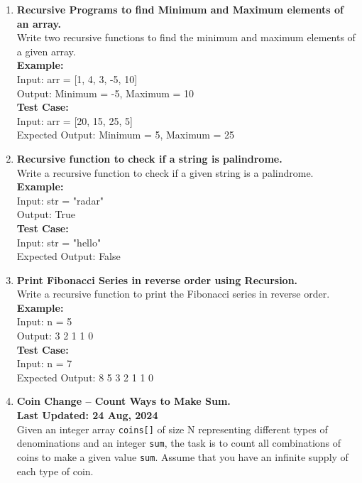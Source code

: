 \documentclass[12pt]{article}
\begin{document}
\begin{enumerate}
    \item \textbf{Recursive Programs to find Minimum and Maximum elements of an array.} \\
    Write two recursive functions to find the minimum and maximum elements of a given array. \\
    \textbf{Example:} \\
    Input: arr = [1, 4, 3, -5, 10] \\
    Output: Minimum = -5, Maximum = 10 \\
    \textbf{Test Case:} \\
    Input: arr = [20, 15, 25, 5] \\
    Expected Output: Minimum = 5, Maximum = 25
    
    \item \textbf{Recursive function to check if a string is palindrome.} \\
    Write a recursive function to check if a given string is a palindrome. \\
    \textbf{Example:} \\
    Input: str = "radar" \\
    Output: True \\
    \textbf{Test Case:} \\
    Input: str = "hello" \\
    Expected Output: False
    
    \item \textbf{Print Fibonacci Series in reverse order using Recursion.} \\
    Write a recursive function to print the Fibonacci series in reverse order. \\
    \textbf{Example:} \\
    Input: n = 5 \\
    Output: 3 2 1 1 0 \\
    \textbf{Test Case:} \\
    Input: n = 7 \\
    Expected Output: 8 5 3 2 1 1 0
    
    \item \textbf{Coin Change – Count Ways to Make Sum.} \\
    \textbf{Last Updated: 24 Aug, 2024} \\
    Given an integer array \texttt{coins[]} of size N representing different types of denominations and an integer \texttt{sum}, the task is to count all combinations of coins to make a given value \texttt{sum}. Assume that you have an infinite supply of each type of coin.
    

\end{enumerate}
\end{document}
